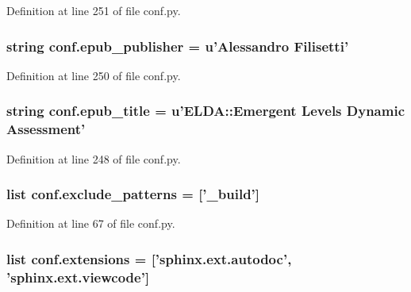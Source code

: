 Definition at line 251 of file conf.\-py.

\hypertarget{a00132_a13c40319d84c9383e0d119773cc1ed02}{
\subsubsection[{epub\-\_\-publisher}]{\setlength{\rightskip}{0pt plus 5cm}string conf.\-epub\-\_\-publisher = u'Alessandro Filisetti'}}\label{a00132_a13c40319d84c9383e0d119773cc1ed02}


Definition at line 250 of file conf.\-py.

\hypertarget{a00132_a9e0d62d22b83ce34deb3f16ba63cedfe}{
\subsubsection[{epub\-\_\-title}]{\setlength{\rightskip}{0pt plus 5cm}string conf.\-epub\-\_\-title = u'E\-L\-D\-A\-::\-Emergent Levels Dynamic Assessment'}}\label{a00132_a9e0d62d22b83ce34deb3f16ba63cedfe}


Definition at line 248 of file conf.\-py.

\hypertarget{a00132_a7ad48fb6f3e9b129c02346ea0d3527c1}{
\subsubsection[{exclude\-\_\-patterns}]{\setlength{\rightskip}{0pt plus 5cm}list conf.\-exclude\-\_\-patterns = \mbox{[}'\-\_\-build'\mbox{]}}}\label{a00132_a7ad48fb6f3e9b129c02346ea0d3527c1}


Definition at line 67 of file conf.\-py.

\hypertarget{a00132_ae475e080536acb271a0a0efe56c3ba42}{
\subsubsection[{extensions}]{\setlength{\rightskip}{0pt plus 5cm}list conf.\-extensions = \mbox{[}'sphinx.\-ext.\-autodoc', 'sphinx.\-ext.\-viewcode'\mbox{]}}}\label{a00132_ae475e080536acb271a0a0efe56c3ba42}


